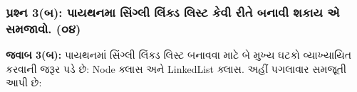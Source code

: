 \hypertarget{uxaaauxab0uxab6uxaa8-3uxaac-uxaaauxaafuxaa5uxaa8uxaae-uxab8uxa97uxab2-uxab2uxa95uxaa1-uxab2uxab8uxa9f-uxa95uxab5-uxab0uxaa4-uxaacuxaa8uxab5-uxab6uxa95uxaaf-uxa8f-uxab8uxaaeuxa9cuxab5.-uxae6uxaea}{%
\subsubsection{પ્રશ્ન 3(બ): પાયથનમા સિંગ્લી લિંક્ડ લિસ્ટ કેવી રીતે બનાવી શકાય એ
સમજાવો.
(૦૪)}\label{uxaaauxab0uxab6uxaa8-3uxaac-uxaaauxaafuxaa5uxaa8uxaae-uxab8uxa97uxab2-uxab2uxa95uxaa1-uxab2uxab8uxa9f-uxa95uxab5-uxab0uxaa4-uxaacuxaa8uxab5-uxab6uxa95uxaaf-uxa8f-uxab8uxaaeuxa9cuxab5.-uxae6uxaea}}

\textbf{જવાબ 3(બ):} પાયથનમાં સિંગ્લી લિંક્ડ લિસ્ટ બનાવવા માટે બે મુખ્ય ઘટકો
વ્યાખ્યાયિત કરવાની જરૂર પડે છે: Node ક્લાસ અને LinkedList ક્લાસ. અહીં પગલાવાર
સમજૂતી આપી છે:

